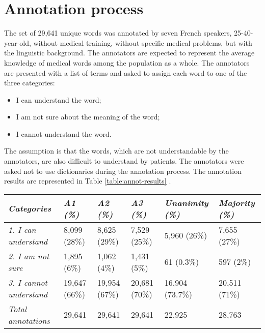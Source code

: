 \section{Annotation process}

The set of 29,641 unique words was annotated by seven French speakers, 25-40-year-old, without medical training, without specific medical problems, but with the linguistic background. The annotators are expected to represent the average knowledge of medical words among the population as a whole. The annotators are presented with a list of terms and asked to assign each word to one of the three categories:

\begin{itemize}
    \item  I can understand the word;
    \item  I am not sure about the meaning of the word;
    \item  I cannot understand the word.
\end{itemize}
The assumption is that the words, which are not understandable by the annotators, are also difficult to understand by patients. The annotators were asked not to use dictionaries during the annotation process. The annotation results are represented in Table \ref{table:annot-results} .

\begin{table*}
\begin{tabular}{l|lllll}
\hline
\textit{Categories}             & \textit{A1 (\%)} & \textit{A2 (\%)} & \textit{A3 (\%)} & \textit{Unanimity (\%)} & \textit{Majority (\%)} \\ \hline
\textit{1. I can understand}    & 8,099 (28\%)     & 8,625 (29\%)     & 7,529 (25\%)     & 5,960 (26\%)            & 7,655 (27\%)           \\
\textit{2. I am not sure}       & 1,895 (6\%)      & 1,062 (4\%)      & 1,431 (5\%)      & 61 (0.3\%)              & 597 (2\%)              \\
\textit{3. I cannot understand} & 19,647 (66\%)    & 19,954 (67\%)    & 20,681 (70\%)    & 16,904 (73.7\%)         & 20,511 (71\%)          \\ \hline
\textit{Total annotations}      & 29,641           & 29,641           & 29,641           & 22,925                  & 28,763                 \\ \hline
\end{tabular}
\caption{Number (and percentage) of words assigned to reference categories by three annotators (A1, A2
and A3), and in the derived datasets unanimity and majority.}
\label{table:annot-results}
\end{table*}